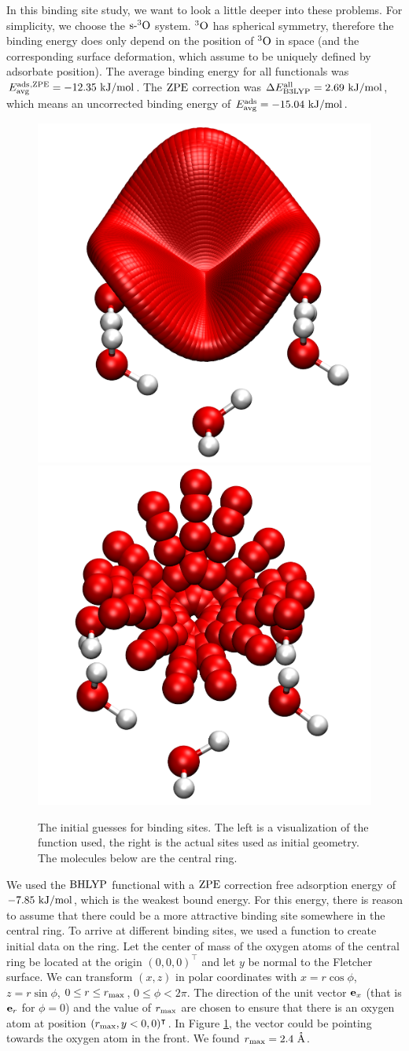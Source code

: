 \documentclass[8.5pt,twoside,twocolumn]{article}
\newcommand\zpe{\enmat{\te{ZPE}}}
\newcommand\eall{\enmat{E^{\te{all}}}}
\newcommand\sur{\enmat{\te{s-}}}
\renewcommand{\Ang}{\mathring{\te{A}}}
\newcommand\tripo{\enmat{{^3\te{O}}}}
\newcommand\kmo{\enmat{\te {kJ/mol}}}
\theoremstyle{standard}
\begin{document}
In this binding site study, we want to look a little deeper into these problems. For
simplicity, we choose the $\sur\tripo$ system. $\tripo$ has spherical symmetry, 
therefore the binding energy does only depend on the position of $\tripo$ in space
(and the corresponding surface deformation, which assume to be uniquely
defined by adsorbate position).
The average binding energy for
all functionals was \mbox{$\avg{^{\te{,ZPE}}}=-12.35~\kmo$}. The $\zpe$ correction was
\mbox{$\Dl\eall_{\btlyp}=2.69~\kmo$}, which means an uncorrected binding energy
of \mbox{$\avg=-15.04~\kmo$}.

\begin{figure}[b!]
\includegraphics[width=.24\textwidth]{./img/SiteSnapshotMany.png}
\includegraphics[width=.24\textwidth]{./img/SiteSnapshotOriginal.png}
\caption{The initial guesses for binding sites. The left is a visualization of the function
used, the right is the actual sites used as initial geometry. The molecules
below are the central ring.}
\label{Fig:Adv:BindingSitesGuess}
\end{figure}

We used the $\text{BHLYP}$ functional with a $\zpe$ correction free adsorption energy 
of $-7.85~\kmo$, which is the weakest bound energy. For this energy,
there is reason to assume that there could be a more attractive binding site
somewhere in the central ring. To arrive at different binding sites, we used
a function to create initial data on the ring. Let the center of mass of the oxygen
atoms of the central ring be located at the origin $(0,0,0)^{\intercal}$ and let $y$ be
normal to the Fletcher surface. We can transform $(x,z)$ in polar coordinates with
$x=r \cos \phi$, $z=r \sin\phi$, $0 \leq r \leq r_{\text{max}}$, $0 \leq \phi<2\pi$. The direction of the
unit vector $\mathbf{e}_x$ (that is $\mathbf{e}_r$ for $\phi=0$) and the value of $r_{\text{max}}$ are
chosen to ensure that there is an oxygen atom at position $(r_{\text{max}},y < 0,0)^{\intercal}$. In
Figure \ref{Fig:Adv:BindingSitesGuess}, the vector could be pointing towards the oxygen
atom in the front. We found $\rmax=2.4~\Ang$.
\end{document}
